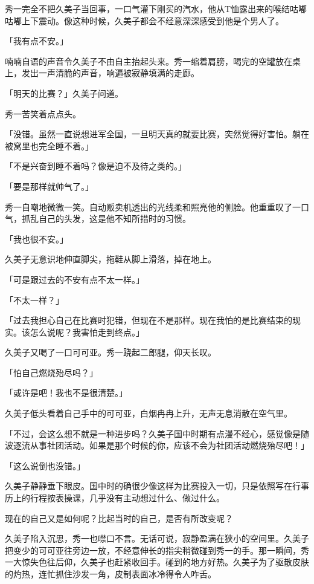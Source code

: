 \documentclass[UTF8]{ctexart}
\begin{document}
    秀一完全不把久美子当回事，一口气灌下刚买的汽水，他从T恤露出来的喉结咕嘟咕嘟上下震动。像这种时候，久美子都会不经意深深感受到他是个男人了。 

    「我有点不安。」 

    喃喃自语的声音令久美子不由自主抬起头来。秀一缩着肩膀，喝完的空罐放在桌上，发出一声清脆的声音，响遍被寂静填满的走廊。 

    「明天的比赛？」久美子问道。 

    秀一苦笑着点点头。 

    「没错。虽然一直说想进军全国，一旦明天真的就要比赛，突然觉得好害怕。躺在被窝里也完全睡不着。」 

    「不是兴奋到睡不着吗？像是迫不及待之类的。」 

    「要是那样就帅气了。」 

    秀一自嘲地微微一笑。自动贩卖机透出的光线柔和照亮他的侧脸。他重重叹了一口气，抓乱自己的头发，这是他不知所措时的习惯。 

    「我也很不安。」 

    久美子无意识地伸直脚尖，拖鞋从脚上滑落，掉在地上。 

    「可是跟过去的不安有点不太一样。」 

    「不太一样？」 

    「过去我担心自己在比赛时犯错，但现在不是那样。现在我怕的是比赛结束的现实。该怎么说呢？我害怕走到终点。」 

    久美子又喝了一口可可亚。秀一跷起二郎腿，仰天长叹。 

    「怕自己燃烧殆尽吗？」 

    「或许是吧！我也不是很清楚。」 

    久美子低头看着自己手中的可可亚，白烟冉冉上升，无声无息消散在空气里。 

    「不过，会这么想不就是一种进步吗？久美子国中时期有点漫不经心，感觉像是随波逐流从事社团活动。如果是那个时候的你，应该不会为社团活动燃烧殆尽吧！」 

    「这么说倒也没错。」 

    久美子静静垂下眼皮。国中时的确很少像这样为比赛投入一切，只是依照写在行事历上的行程按表操课，几乎没有主动想过什么、做过什么。 

    现在的自己又是如何呢？比起当时的自己，是否有所改变呢？ 

    久美子陷入沉思，秀一也噤口不言。无话可说，寂静盈满在狭小的空间里。久美子把变少的可可亚往旁边一放，不经意伸长的指尖稍微碰到秀一的手。那一瞬间，秀一大惊失色往后仰，久美子也赶紧收回手。碰到的地方好热。久美子为了驱散皮肤的灼热，连忙抓住沙发一角，皮制表面冰冷得令人咋舌。 
\end{document}
